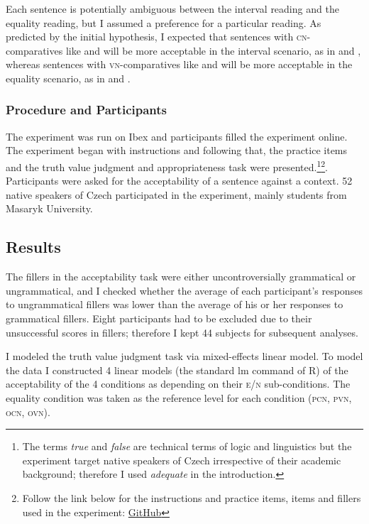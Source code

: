 \documentclass[output=paper,
]{langscibook}
\begin{document}
\noindent Each sentence is potentially ambiguous between the interval reading and the equality reading, but I assumed a preference for a particular reading. As predicted by the initial hypothesis, I expected that sentences with \textsc{cn-}comparatives like  and  will be more acceptable in the interval scenario, as in  and , whereas sentences with \textsc{vn-}comparatives like  and  will be more acceptable in the equality scenario, as in  and .

\subsubsection{Procedure and Participants}
The experiment was run on Ibex and participants filled the experiment online. The experiment began with instructions and following that, the practice items and the truth value judgment and appropriateness task were presented.\footnote{The terms \textit{true} and \textit{false} are technical terms of logic and linguistics but the experiment target native speakers of Czech irrespective of their academic background; therefore I used \textit{adequate} in the introduction.}\footnote{Follow the link below for the instructions and practice items, items and fillers used in the experiment: \href{https://github.com/ivetasafratova/Negation-comparative-and-alternatives-Experimental-evidence-from-Czech.git}{GitHub}}.
Participants were asked for the acceptability of a sentence against a context. 52 native speakers of Czech participated in the experiment, mainly students from Masaryk University.  


\subsection{Results}
The fillers in the acceptability task were either uncontroversially grammatical or ungrammatical, and I checked whether the average of each participant’s responses to ungrammatical fillers was lower than the average of his or her responses to grammatical fillers. Eight participants had to be excluded due to their unsuccessful scores in fillers; therefore I kept 44 subjects for subsequent analyses.

I modeled the truth value judgment task via mixed-effects linear model. To model the data I constructed 4 linear models (the standard lm command of R) of the acceptability of the 4 conditions as depending on their \textsc{e/n} sub-conditions. The equality condition was taken as the reference level for each condition (\textsc{pcn, pvn, ocn, ovn}). 
\end{document}

